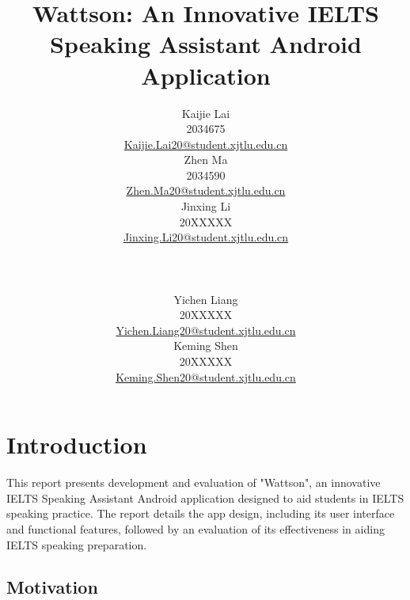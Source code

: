 \documentclass[conference,10pt,letterpaper]{IEEEtran}
\begin{document}
	
	\title{Wattson: An Innovative IELTS Speaking Assistant Android Application}
	
	\makeatletter
	\newcommand{\authorblock}[2]{
		\parbox[t]{.3333\textwidth}{\centering #1\\#2}
	}
	\makeatother
	
	\author{
		\authorblock{Kaijie Lai}{
			2034675\\
			\href{mailto:Kaijie.Lai20@student.xjtlu.edu.cn}{Kaijie.Lai20@student.xjtlu.edu.cn}
		}
		\authorblock{Zhen Ma}{
			2034590\\
			\href{mailto:Zhen.Ma20@student.xjtlu.edu.cn}{Zhen.Ma20@student.xjtlu.edu.cn}
		}
		\authorblock{Jinxing Li}{
			20XXXXX\\
			\href{mailto:Jinxing.Li20@student.xjtlu.edu.cn}{Jinxing.Li20@student.xjtlu.edu.cn}
		}\\ \\[10pt]
		\authorblock{Yichen Liang}{
			20XXXXX\\
			\href{mailto:Yichen.Liang20@student.xjtlu.edu.cn}{Yichen.Liang20@student.xjtlu.edu.cn}
		}
		\authorblock{Keming Shen}{
			20XXXXX\\
			\href{mailto:Keming.Shen20@student.xjtlu.edu.cn}{Keming.Shen20@student.xjtlu.edu.cn}
		}
	}

	\maketitle
	
	\thispagestyle{fancy}
	
	\pagestyle{fancy} %
	\fancyhead[RO,R]{\today}
	\fancyfoot[LO,L]{}
	\fancyfoot[CO,C]{\thepage}
	\fancyfoot[RO,R]{}
	\renewcommand{\headrulewidth}{0.4pt}
	\renewcommand{\footrulewidth}{0.4pt}
	
	\section{Introduction}
	This report presents development and evaluation of "Wattson", an innovative IELTS Speaking Assistant Android application designed to aid students in IELTS speaking practice. The report details the app design, including its user interface and functional features, followed by an evaluation of its effectiveness in aiding IELTS speaking preparation. 
	
	\subsection{Motivation}
	
\end{document}
